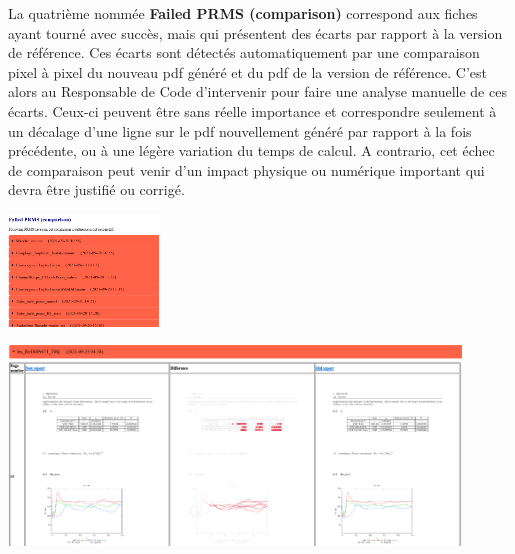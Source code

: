 La quatrième nommée \textbf{Failed PRMS (comparison)} correspond aux fiches ayant tourné avec succès, mais qui présentent des écarts par rapport à la version de référence. Ces écarts sont détectés automatiquement par une comparaison pixel à pixel du nouveau pdf généré et du pdf de la version de référence. C'est alors au Responsable de Code d'intervenir pour faire une analyse manuelle de ces écarts. Ceux-ci peuvent être sans réelle importance et correspondre seulement à un décalage d'une ligne sur le pdf nouvellement généré par rapport à la fois précédente, ou à une légère variation du temps de calcul. A contrario, cet échec de comparaison peut venir d'un impact physique ou numérique important qui devra être justifié ou corrigé.\vspace{0.9cm}   \\

\begin{minipage}[c]{0.25\linewidth}
   \includegraphics[width=4cm]{pictures/validation-PRMSfailedcomp.png}\vspace*{0.2cm}
\end{minipage} \hfill
\begin{minipage}[c]{0.7\linewidth}
   \includegraphics[width=12cm]{pictures/validation-comparepdf2.png}\vspace*{0.2cm}
\end{minipage}
\vspace{0.5cm}

